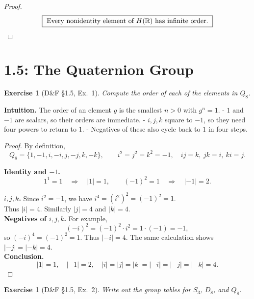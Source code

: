 \documentclass[12pt]{article}
\newtheorem{exercise}[theorem]{Exercise}
\theoremstyle{definition}
\begin{document}
\begin{proof}
\[
\boxed{\ \text{Every nonidentity element of }H(\Bbb R)\text{ has infinite order.}\ }
\]

\end{proof}

\newpage

\dotfill
\section*{1.5: The Quaternion Group}
\dotfill

\newpage

\begin{exercise}[D\&F §1.5, Ex.~1]
Compute the order of each of the elements in $Q_8$.
\end{exercise}

\dotfill

\noindent\textbf{Intuition.}
The order of an element $g$ is the smallest $n>0$ with $g^n=1$. 
- $1$ and $-1$ are scalars, so their orders are immediate.  
- $i,j,k$ square to $-1$, so they need four powers to return to $1$.  
- Negatives of these also cycle back to $1$ in four steps.

\dotfill

\begin{proof}
By definition,
\[
Q_8=\{1,-1,i,-i,j,-j,k,-k\},\qquad i^2=j^2=k^2=-1,\quad ij=k,\ jk=i,\ ki=j.
\]

\noindent
\textbf{Identity and $-1$.}  
\[
1^1=1\quad\Rightarrow\quad |1|=1,\qquad (-1)^2=1\quad\Rightarrow\quad |-1|=2.
\]

\noindent
\textbf{$i,j,k$.}  
Since $i^2=-1$, we have $i^4=(i^2)^2=(-1)^2=1$.\\

\noindent
Thus $|i|=4$. Similarly $|j|=4$ and $|k|=4$.\\

\noindent
\textbf{Negatives of $i,j,k$.}  
For example,
\[
(-i)^2=(-1)^2\cdot i^2=1\cdot(-1)=-1,
\]
so $(-i)^4=(-1)^2=1$. Thus $|-i|=4$.  
The same calculation shows $|-j|=|-k|=4$.\\

\noindent
\textbf{Conclusion.}
\[
\boxed{
|1|=1,\quad |-1|=2,\quad |i|=|j|=|k|=|-i|=|-j|=|-k|=4.
}
\]
\end{proof}

\newpage

\begin{exercise}[D\&F §1.5, Ex.~2]
Write out the group tables for $S_3$, $D_8$, and $Q_8$.
\end{exercise}
\end{document}
